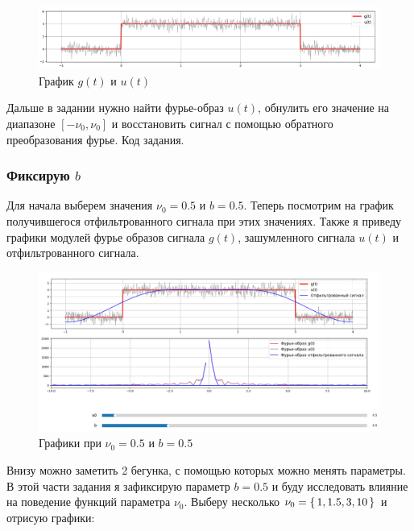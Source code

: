 \documentclass[a4paper,12pt]{article}
\begin{document}
\begin{figure}[H]  
    \centering
    \includegraphics[width=1\textwidth]{../images/signalShum.png}
    \caption{График \(g(t)\) и \(u(t)\)}  
    \label{fig:my_image}  
\end{figure}
Дальше в задании нужно найти фурье-образ \(u(t)\), обнулить его значение на диапазоне \([- \nu_0, \nu_0]\)
и восстановить сигнал с помощью обратного преобразования фурье. Код задания.

\subsubsection{Фиксирую \(b\)}

Для начала выберем значения \(\nu_0 = 0.5\) и \(b = 0.5\). Теперь посмотрим на график
получившегося отфильтрованного сигнала при этих значениях. Также я приведу графики 
модулей фурье образов сигнала \(g(t)\), зашумленного сигнала \(u(t)\) и отфильтрованного сигнала.

\begin{figure}[H]  
    \centering
    \includegraphics[width=1\textwidth]{../images/1.1_0.5_0.5.png}
    \caption{Графики при \(\nu_0 = 0.5\) и \(b = 0.5\)}  
    \label{fig:my_image}  
\end{figure}


Внизу можно заметить 2 бегунка, с помощью которых можно менять параметры.
В этой части задания я зафиксирую параметр \(b = 0.5\) и буду исследовать влияние
на поведение функций параметра \(\nu_0\). Выберу несколько \(\nu_0 = \set{1, 1.5, 3, 10}\)
и отрисую графики:
\end{document}
